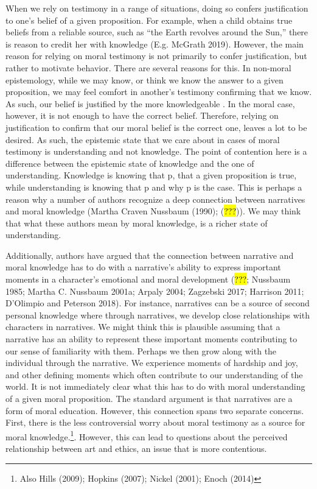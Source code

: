\documentclass[
  letterpaper,
  DIV=11,
  numbers=noendperiod]{scrartcl}
\theoremstyle{remark}
\begin{document}
When we rely on testimony in a range of situations, doing so confers
justification to one's belief of a given proposition. For example, when
a child obtains true beliefs from a reliable source, such as ``the Earth
revolves around the Sun,'' there is reason to credit her with knowledge
(E.g. McGrath 2019). However, the main reason for relying on moral
testimony is not primarily to confer justification, but rather to
motivate behavior. There are several reasons for this. In non-moral
epistemology, while we may know, or think we know the answer to a given
proposition, we may feel comfort in another's testimony confirming that
we know. As such, our belief is justified by the more knowledgeable . In
the moral case, however, it is not enough to have the correct belief.
Therefore, relying on justification to confirm that our moral belief is
the correct one, leaves a lot to be desired. As such, the epistemic
state that we care about in cases of moral testimony is understanding
and not knowledge. The point of contention here is a difference between
the epistemic state of knowledge and the one of understanding. Knowledge
is knowing that p, that a given proposition is true, while understanding
is knowing that p and why p is the case. This is perhaps a reason why a
number of authors recognize a deep connection between narratives and
moral knowledge (Martha Craven Nussbaum (1990); (\hl{???})). We may
think that what these authors mean by moral knowledge, is a richer state
of understanding.

Additionally, authors have argued that the connection between narrative
and moral knowledge has to do with a narrative's ability to express
important moments in a character's emotional and moral development
(\hl{???}; Nussbaum 1985; Martha C. Nussbaum 2001a; Arpaly 2004;
Zagzebski 2017; Harrison 2011; D'Olimpio and Peterson 2018). For
instance, narratives can be a source of second personal knowledge where
through narratives, we develop close relationships with characters in
narratives. We might think this is plausible assuming that a narrative
has an ability to represent these important moments contributing to our
sense of familiarity with them. Perhaps we then grow along with the
individual through the narrative. We experience moments of hardship and
joy, and other defining moments which often contribute to our
understanding of the world. It is not immediately clear what this has to
do with moral understanding of a given moral proposition. The standard
argument is that narratives are a form of moral education. However, this
connection spans two separate concerns. First, there is the less
controversial worry about moral testimony as a source for moral
knowledge.\footnote{Also Hills (2009); Hopkins (2007); Nickel (2001);
  Enoch (2014)}. However, this can lead to questions about the perceived
relationship between art and ethics, an issue that is more contentious.
\end{document}
